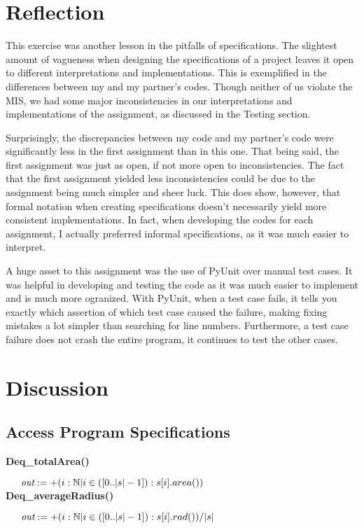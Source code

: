\documentclass{article}
\begin{document}
\section{Reflection}
{ 
\indent \indent This exercise was another lesson in the pitfalls of specifications. The slightest amount of vagueness when designing the specifications of a project leaves it open to different interpretations and implementations. This is exemplified in the differences between my and my partner's codes. Though neither of us violate the MIS, we had some major inconsistencies in our interpretations and implementations of the assignment, as discussed in the Testing section. 

\indent Surprisingly, the discrepancies  between my code and my partner's code were significantly less in the first assignment than in this one.  That being said, the first assignment was just as open, if not more open to inconsistencies. The fact that the first assignment yielded less inconsistencies could be due to the assignment being much simpler and sheer luck. This does show, however, that formal notation when creating specifications doesn't necessarily yield more consistent implementations. In fact, when developing the codes for each assignment, I actually preferred informal specifications, as it was much easier to interpret.

\indent A huge asset to this assignment was the use of PyUnit over manual test cases. It was helpful in developing and testing the code as it was much easier to implement and is much more ogranized. With PyUnit, when a test case fails, it tells you exactly which assertion of which test case caused the failure, making fixing mistakes a lot simpler than searching for line numbers. Furthermore, a test case failure does not crash the entire program, it continues to test the other cases.

}

\section{Discussion}

\subsection{Access Program Specifications}
{ 
\textbf{Deq\_totalArea()}

\begin{math}
\indent \emph{out} := +(i : \mathbb{N} | i \in ([0..|s|-1]) : s[i].area())
\end{math}
\\
\textbf{Deq\_averageRadius()}

\begin{math}
\indent \emph{out} := +(i : \mathbb{N} | i \in ([0..|s|-1]) : s[i].rad())/|s|
\end{math}

}
\end{document}
